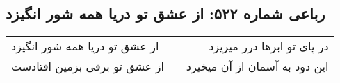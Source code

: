 \begin{center}
\section*{رباعی شماره ۵۲۲: از عشق تو دریا همه شور انگیزد}
\label{sec:0522}
\begin{longtable}{l p{0.5cm} r}
از عشق تو دریا همه شور انگیزد
&&
در پای تو ابرها درر میریزد
\\
از عشق تو برقی بزمین افتادست
&&
این دود به آسمان از آن میخیزد
\\
\end{longtable}
\end{center}
